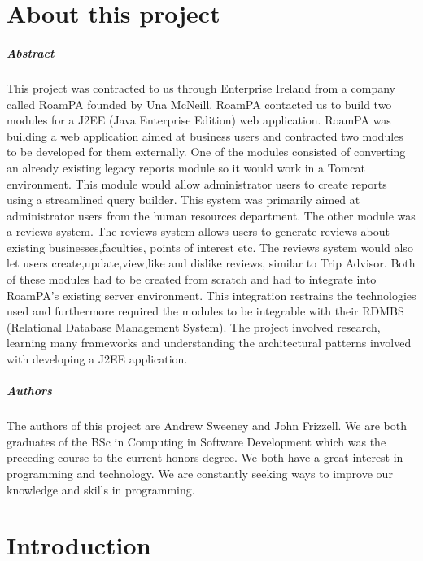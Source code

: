 
\chapter*{About this project}
\paragraph{Abstract}

This project was contracted to us through Enterprise Ireland from a company called RoamPA founded by Una McNeill. RoamPA contacted us to build two modules for a J2EE (Java Enterprise Edition) web application. RoamPA was building a web application aimed at business users and contracted two modules to be developed for them externally. One of the modules consisted of converting an already existing legacy reports module so it would work in a Tomcat environment. This module would allow administrator users to create reports using a streamlined query builder. This system was primarily aimed at administrator users from the human resources department. The other module 
was a reviews system. The reviews system allows users to generate reviews about existing businesses,faculties, points of interest etc. The reviews system would also let users create,update,view,like and dislike reviews, similar to Trip Advisor. Both of these modules had to be created from scratch and had to integrate into RoamPA's existing server environment. This integration restrains the technologies used and furthermore required the modules to be integrable with their RDMBS (Relational Database Management System). The project involved research, learning many frameworks and understanding the architectural patterns involved with developing a J2EE application.

\paragraph{Authors}

The authors of this project are Andrew Sweeney and John Frizzell. We are both graduates of the BSc in Computing in Software Development which was the preceding course to the current honors degree. We both have a great interest in programming and technology. We are constantly seeking ways to improve our knowledge and skills in programming.


\chapter{Introduction}

